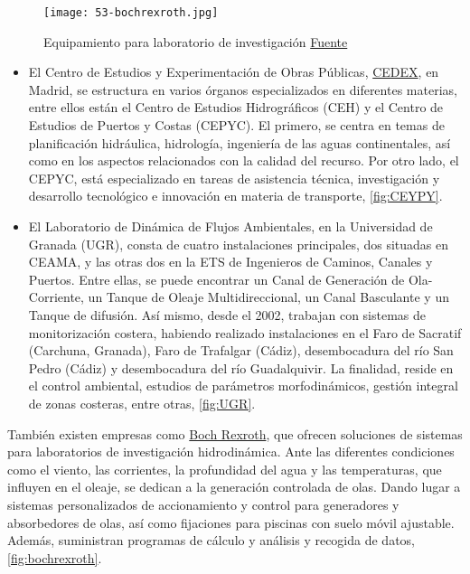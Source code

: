\begin{figure}
\centering
\texttt{[image: 53-bochrexroth.jpg]}
\caption[Equipamiento para laboratorio de investigación]{Equipamiento para laboratorio de investigación \href{https://www.boschrexroth.com/es/mx/industrias/aplicaciones-e-ingenieria-de-maquinaria/investigacion-hidrodinamica/hydrodynamic-research-1}{Fuente}}
\label{fig:bochrexroth}
\end{figure}

\begin{itemize}
\item
  El Centro de Estudios y Experimentación de Obras Públicas,
  \href{http://www.cedex.es/CEDEX/LANG_CASTELLANO/ORGANISMO/CENTYLAB/}{CEDEX},
  en Madrid, se estructura en varios órganos especializados en
  diferentes materias, entre ellos están el Centro de Estudios
  Hidrográficos (CEH) y el Centro de Estudios de Puertos y Costas
  (CEPYC). El primero, se centra en temas de planificación hidráulica,
  hidrología, ingeniería de las aguas continentales, así como en los
  aspectos relacionados con la calidad del recurso. Por otro lado, el
  CEPYC, está especializado en tareas de asistencia técnica,
  investigación y desarrollo tecnológico e innovación en materia de
  transporte, \autoref{fig:CEYPY}.

\item
  El Laboratorio de Dinámica de Flujos Ambientales, en la Universidad de
  Granada (UGR), consta de cuatro instalaciones principales, dos
  situadas en CEAMA, y las otras dos en la ETS de Ingenieros de Caminos,
  Canales y Puertos. Entre ellas, se puede encontrar un Canal de
  Generación de Ola-Corriente, un Tanque de Oleaje Multidireccional, un
  Canal Basculante y un Tanque de difusión. Así mismo, desde el 2002,
  trabajan con sistemas de monitorización costera, habiendo realizado
  instalaciones en el Faro de Sacratif (Carchuna, Granada), Faro de
  Trafalgar (Cádiz), desembocadura del río San Pedro (Cádiz) y
  desembocadura del río Guadalquivir. La finalidad, reside en el control
  ambiental, estudios de parámetros morfodinámicos, gestión integral de
  zonas costeras, entre otras, \autoref{fig:UGR}.
\end{itemize}

También existen empresas como
\href{https://www.boschrexroth.com/es/mx/industrias/aplicaciones-e-ingenieria-de-maquinaria/investigacion-hidrodinamica/hydrodynamic-research-1}{Boch
Rexroth}, que ofrecen soluciones de sistemas para laboratorios de
investigación hidrodinámica. Ante las diferentes condiciones como el
viento, las corrientes, la profundidad del agua y las temperaturas, que
influyen en el oleaje, se dedican a la generación controlada de olas.
Dando lugar a sistemas personalizados de accionamiento y control para
generadores y absorbedores de olas, así como fijaciones para piscinas
con suelo móvil ajustable. Además, suministran programas de cálculo y
análisis y recogida de datos, \autoref{fig:bochrexroth}.

